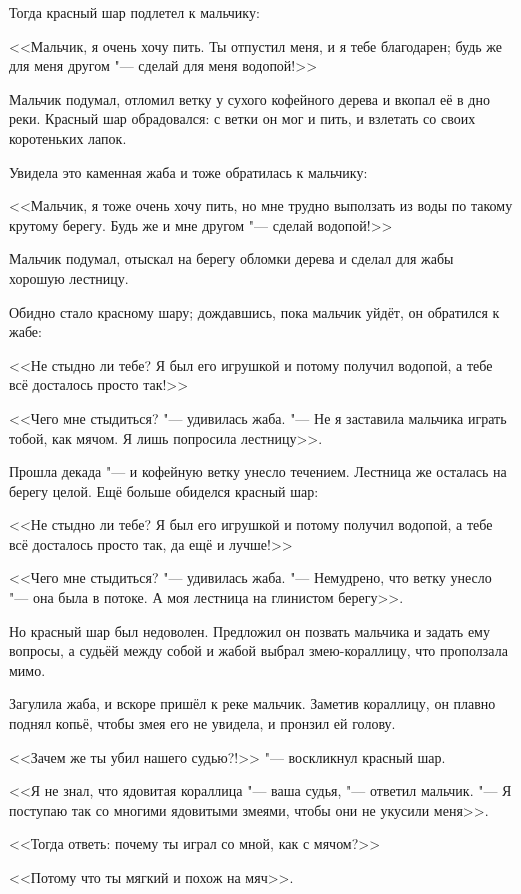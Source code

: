 \documentclass[a4paper,10pt]{book}
\begin{document}
Тогда красный шар подлетел к мальчику:

<<Мальчик, я очень хочу пить. Ты отпустил меня, и я тебе благодарен; будь же 
для меня другом "--- сделай для меня водопой!>>

Мальчик подумал, отломил ветку у сухого кофейного дерева и вкопал её в дно 
реки. 
Красный шар обрадовался: с ветки он мог и пить, и взлетать со своих коротеньких 
лапок.

Увидела это каменная жаба и тоже обратилась к мальчику:

<<Мальчик, я тоже очень хочу пить, но мне трудно выползать из воды по такому 
крутому берегу. Будь же и мне другом "--- сделай водопой!>>

Мальчик подумал, отыскал на берегу обломки дерева и сделал для жабы хорошую 
лестницу.

Обидно стало красному шару; дождавшись, пока мальчик уйдёт, он обратился к жабе:

<<Не стыдно ли тебе? Я был его игрушкой и потому получил водопой, а тебе всё 
досталось просто так!>>

<<Чего мне стыдиться? "--- удивилась жаба. "--- Не я заставила мальчика играть 
тобой, как мячом. Я лишь попросила лестницу>>.

Прошла декада "--- и кофейную ветку унесло течением. Лестница же осталась на 
берегу целой. Ещё больше обиделся красный шар:

<<Не стыдно ли тебе? Я был его игрушкой и потому получил водопой, а тебе всё 
досталось просто так, да ещё и лучше!>>

<<Чего мне стыдиться? "--- удивилась жаба. "--- Немудрено, что ветку унесло 
"--- 
она была в потоке. А моя лестница на глинистом берегу>>.

Но красный шар был недоволен. Предложил он позвать мальчика и задать ему 
вопросы,
а судьёй между собой и жабой выбрал змею-кораллицу, что проползала мимо.

Загулила жаба, и вскоре пришёл к реке мальчик. Заметив кораллицу, он плавно 
поднял копьё,
чтобы змея его не увидела, и пронзил ей голову.

<<Зачем же ты убил нашего судью?!>> "--- воскликнул красный шар.

<<Я не знал, что ядовитая кораллица "--- ваша судья, "--- ответил мальчик. "--- 
Я поступаю так
со многими ядовитыми змеями, чтобы они не укусили меня>>.

<<Тогда ответь: почему ты играл со мной, как с мячом?>>

<<Потому что ты мягкий и похож на мяч>>.
\end{document}
